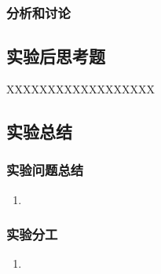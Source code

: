 \documentclass[dvipsnames, svgnames,a4paper,11pt]{article}
\begin{document}
\subsubsection{分析和讨论}







		

\subsection{实验后思考题}	
	
    \begin{question}
        XXXXXXXXXXXXXXXXXX
    \end{question}








\clearpage

\subsection{实验总结}
    
    \subsubsection{实验问题总结}

        \begin{enumerate}
            \item 
        \end{enumerate}

    \subsubsection{实验分工}

        \begin{enumerate}
            \item
        \end{enumerate}

\end{document}
